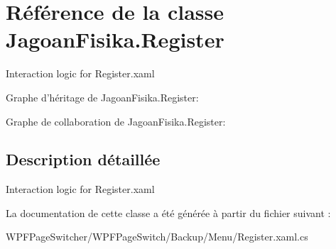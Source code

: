 \hypertarget{class_jagoan_fisika_1_1_register}{\section{Référence de la classe Jagoan\+Fisika.\+Register}
\label{class_jagoan_fisika_1_1_register}
}


Interaction logic for Register.\+xaml  




Graphe d'héritage de Jagoan\+Fisika.\+Register\+:


Graphe de collaboration de Jagoan\+Fisika.\+Register\+:


\subsection{Description détaillée}
Interaction logic for Register.\+xaml 



La documentation de cette classe a été générée à partir du fichier suivant \+:\begin{DoxyCompactItemize}
\item 
W\+P\+F\+Page\+Switcher/\+W\+P\+F\+Page\+Switch/\+Backup/\+Menu/Register.\+xaml.\+cs\end{DoxyCompactItemize}
